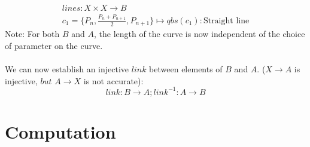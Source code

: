 \documentclass{article}
\begin{document}
\begin{align}
lines: X \times X \rightarrow B\\
c_{1}=\{P_{n},\frac{P_{n}+P_{n+1}}{2},P_{n+1}\} \mapsto qbs(c_{1}): \text{Straight line} 
\end{align}
Note: For both $B$ and $A$, the length of the curve is now independent of the choice of parameter on the curve. ~\cite[]{Taimanov}\\\\
We can now establish an injective $link$ between elements of $B$ and $A$. ($X \rightarrow A$ is injective, $but$ $A \rightarrow X$ is not accurate):
\begin{equation}
link: B \rightarrow A; link^{-1}: A \rightarrow B
\end{equation}
\section{Computation}

\iffalse
\begin{equation} 
\forall u,v \in V :
d(u,v) = 
\begin{cases}
0,  u=v \\
1,  u \neq v 
\end{cases}
\end{equation}
\fi

\printbibliography
\end{document}
